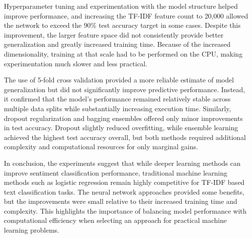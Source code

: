 \documentclass{article}
\begin{document}
Hyperparameter tuning and experimentation with the model structure helped improve performance, and increasing the TF-IDF feature count to 20,000 allowed the network to exceed the 90\% test accuracy target in some cases. Despite this improvement, the larger feature space did not consistently provide better generalization and greatly increased training time. Because of the increased dimensionality, training at that scale had to be performed on the CPU, making experimentation much slower and less practical.

The use of 5-fold cross validation provided a more reliable estimate of model generalization but did not significantly improve predictive performance. Instead, it confirmed that the model’s performance remained relatively stable across multiple data splits while substantially increasing execution time. Similarly, dropout regularization and bagging ensembles offered only minor improvements in test accuracy. Dropout slightly reduced overfitting, while ensemble learning achieved the highest test accuracy overall, but both methods required additional complexity and computational resources for only marginal gains.

In conclusion, the experiments suggest that while deeper learning methods can improve sentiment classification performance, traditional machine learning methods such as logistic regression remain highly competitive for TF-IDF based text classification tasks. The neural network approaches provided some benefits, but the improvements were small relative to their increased training time and complexity. This highlights the importance of balancing model performance with computational efficiency when selecting an approach for practical machine learning problems.
\end{document}

